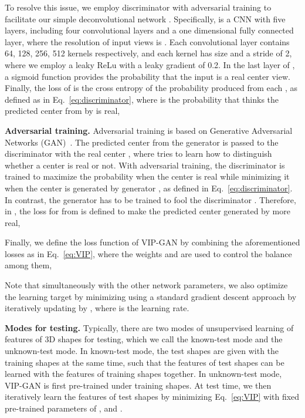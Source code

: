 \documentclass[letterpaper]{article} \usepackage{aaai19}  \usepackage{times}  \usepackage{helvet}  \usepackage{courier}  \usepackage{url}  \usepackage{graphicx}
\begin{document}
To resolve this issue, we employ discriminator  with adversarial training to facilitate our simple deconvolutional network .
Specifically,  is a CNN with five layers, including four convolutional layers and a one dimensional fully connected layer, where the resolution of input views is . Each convolutional layer contains 64, 128, 256, 512 kernels respectively, and each kernel has size  and a stride of 2, where we employ a leaky ReLu with a leaky gradient of 0.2. In the last layer of , a sigmoid function provides the probability that the input is a real center view. Finally, the loss of  is the cross entropy of the probability produced from each , as defined as  in Eq.~\ref{eq:discriminator}, where  is the probability that  thinks the predicted center  from  by  is real,





\noindent\textbf{Adversarial training. }Adversarial training is based on Generative Adversarial Networks (GAN)~\cite{NIPS2014_5423}. The predicted center  from the generator  is passed to the discriminator  with the real center , where  tries to learn how to distinguish whether a center is real or not. With adversarial training, the discriminator  is trained to maximize the probability when the center is real while minimizing it when the center is generated by generator , as defined in Eq.~\ref{eq:discriminator}. In contrast, the generator  has to be trained to fool the discriminator . Therefore, in , the loss  for  from  is defined to make the predicted center  generated by  more real,



Finally, we define the loss function of VIP-GAN by combining the aforementioned losses as in Eq.~\ref{eq:VIP}, where the weights  and  are used to control the balance among them,

Note that simultaneously with the other network parameters, we also optimize the learning target  by minimizing  using a standard gradient descent approach by iteratively updating  by , where  is the learning rate.



\noindent\textbf{Modes for testing. }Typically, there are two modes of unsupervised learning of features  of 3D shapes for testing, which we call the known-test mode and the unknown-test mode. In known-test mode, the test shapes are given with the training shapes at the same time, such that the features of test shapes can be learned with the features of training shapes together. In unknown-test mode, VIP-GAN is first pre-trained under training shapes. At test time, we then iteratively learn the features of test shapes by minimizing Eq.~\ref{eq:VIP} with fixed pre-trained parameters of ,  and .
\end{document}
